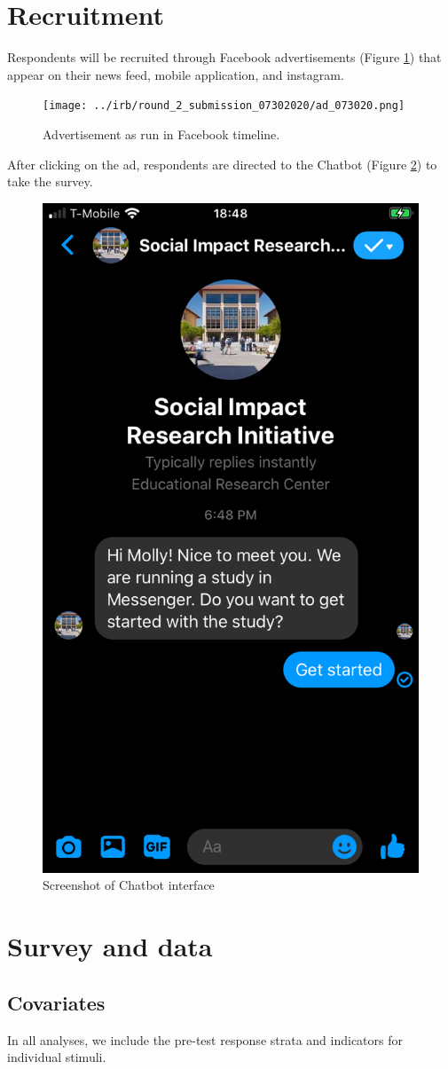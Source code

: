 \documentclass[letterpaper, 12pt, parskip=full,]{scrartcl}
\begin{document}
\clearpage



\clearpage
\appendix

\section{Recruitment}\label{appendix:recruitment}
Respondents will be recruited through Facebook advertisements (Figure \ref{fig:ad}) that appear on their news feed, mobile application, and instagram. 

\begin{figure}[htb]
\centering
\caption{Advertisement as run in Facebook timeline.}
\label{fig:ad}
\texttt{[image: ../irb/round\_2\_submission\_07302020/ad\_073020.png]}
\end{figure}

After clicking on the ad, respondents are directed to the Chatbot (Figure \ref{fig:chatbot}) to take the survey.

\begin{figure}[htb]
\centering
\caption{Screenshot of Chatbot interface}
\label{fig:chatbot}
\includegraphics[width=.25\textwidth]{chatbot_image.png}
\end{figure}

\section{Survey and data}\label{appendix:data}
\subsection{Covariates}\label{appendix:covariates}


In all analyses, we include the pre-test response strata and indicators for individual stimuli.
\end{document}
